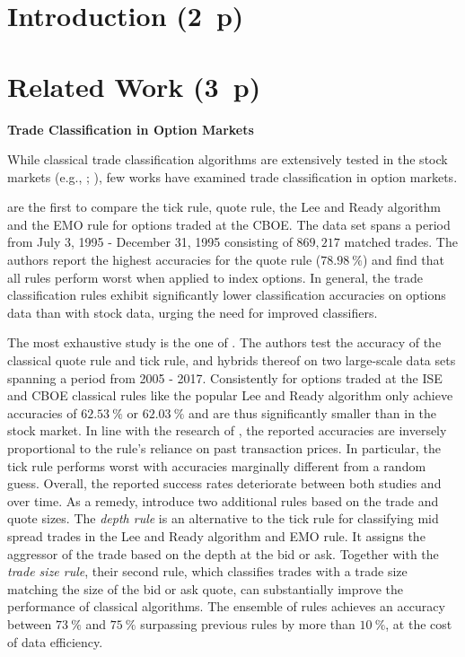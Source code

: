 \section{Introduction (2~p)}\label{sec:introduction}


\section{Related Work (3~p)}\label{sec:related-work}

\textbf{Trade Classification in Option Markets}

While classical trade classification algorithms are extensively tested in the stock markets (e.g., \textcite{chakrabartyTradeClassificationAlgorithms2012}; \textcite{odders-whiteOccurrenceConsequencesInaccurate2000}), few works have examined trade classification in option markets.

\textcite[882--883]{savickasInferringDirectionOption2003} are the first to compare the tick rule, quote rule, the Lee and Ready algorithm and the EMO rule for options traded at the CBOE. The data set spans a period from July 3, 1995 - December 31, 1995 consisting of $869{,}217$ matched trades. The authors report the highest accuracies for the quote rule ($78.98~\%$) and find that all rules perform worst when applied to index options. In general, the trade classification rules exhibit significantly lower classification accuracies on options data than with stock data, urging the need for improved classifiers.

The most exhaustive study is the one of \textcite[1--39]{grauerOptionTradeClassification2022}.  The authors test the accuracy of the classical quote rule and tick rule, and hybrids thereof on two large-scale data sets spanning a period from 2005 - 2017. Consistently for options traded at the ISE and CBOE classical rules like the popular Lee and Ready algorithm only achieve accuracies of $62.53~\%$ or $62.03~\%$ and are thus significantly smaller than in the stock market. In line with the research of  \textcite[886]{savickasInferringDirectionOption2003}, the reported accuracies are inversely proportional to the rule's reliance on past transaction prices. In particular, the tick rule performs worst with accuracies marginally different from a random guess. Overall, the reported success rates deteriorate between both studies and over time. As a remedy, \textcite[14--17]{grauerOptionTradeClassification2022} introduce two additional rules based on the trade and quote sizes. The \textit{depth rule} is an alternative to the tick rule for classifying mid spread trades in the Lee and Ready algorithm and EMO rule. It assigns the aggressor of the trade based on the depth at the bid or ask. Together with the \textit{trade size rule}, their second rule, which classifies trades with a trade size matching the size of the bid or ask quote, can substantially improve the performance of classical algorithms. The ensemble of rules achieves an accuracy between $73~\%$ and $75~\%$ surpassing previous rules by more than $10~\%$, at the cost of data efficiency.

